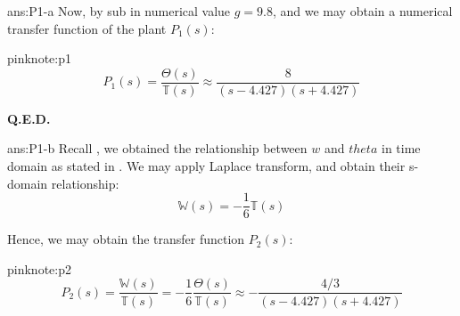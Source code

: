 \documentclass{tron}
\begin{document}
\begin{answer}{ans:P1-a}
	Now, by sub in numerical value $g = 9.8$, and we may obtain a numerical transfer function of the plant $P_1(s)$:

	\begin{note}{pink}{note:p1}	
		\begin{equation}
			 P_1(s) = \frac{\Theta(s)}{\mathbb{T}(s)} \approx \frac{8}{(s-4.427)(s+4.427)} \label{eqn:p1}
		\end{equation}
	\end{note}
	
	\textbf{Q.E.D.}
\end{answer}


\clearpage
\begin{answer}{ans:P1-b}
	Recall , we obtained the relationship between $w$ and $theta$ in time domain as stated in . We may apply Laplace transform, and obtain their s-domain relationship:
	\begin{equation}
		\mathbb{W}(s) = - \frac16 \mathbb{T}(s)
	\end{equation}
	
	Hence, we may obtain the transfer function $P_2(s)$:
	
	\begin{note}{pink}{note:p2}
		\begin{equation}
			P_2(s) = \frac{\mathbb{W}(s)}{\mathbb{T}(s)} = - \frac{1}{6} \frac{\Theta(s)}{\mathbb{T}(s)} \approx - \frac{4/3}{(s-4.427)(s+4.427)}
		\end{equation}
	\end{note}
\end{answer}
\end{document}
